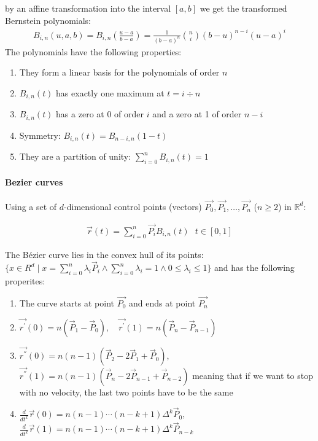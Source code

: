 by an affine transformation into the interval $[a,b]$ we get the transformed Bernstein polynomials:
\begin{align*}
	B_{i,n}(u,a,b) = B_{i,n}\left(\frac{u-a}{b-a}\right) 
	= \frac{1}{(b-a)^n}\binom{n}{i}(b-u)^{n-i}(u-a)^i
\end{align*}
The polynomials have the following properties:
\begin{enumerate}
	\item They form a linear basis for the polynomials of order $n$
	\item $B_{i,n}(t)$ has exactly one maximum at $t = i\div n$
	\item $B_{i,n}(t)$ has a zero at 0 of order $i$ and a zero at 1 of order $n-i$
	\item Symmetry: $B_{i,n}(t) = B_{n-i,n}(1 - t)$
	\item They are a partition of unity: $\sum_{i=0}^n B_{i,n}(t) = 1$
\end{enumerate}

\paragraph{Bezier curves}
Using a set of $d$-dimensional control points (vectors) $\vec{P_0}, \vec{P_1}, \ldots, \vec{P_n}$ ($n\geq 2$) in $\mathbb{R}^d$:
\begin{snugshade*}
	\begin{align*}
		\vec{r}(t) = \sum_{i=0}^n \vec{P_i}B_{i,n}(t)\ \ \ t\in[0,1]
	\end{align*}
\end{snugshade*}
The B\'ezier curve lies in the convex hull of its points:
$\{x\in R^{d}\mid x=\sum_{i=0}^{n}\lambda_{i}{\vec{P}}_{i}\wedge\sum_{i=0}^{n}\lambda_{i}=1\wedge 0\leq\lambda_{i}\leq1\}$
and has the following properites:
\begin{enumerate}
	\item The curve starts at point $\vec{P_0}$ and ends at point $\vec{P_n}$
	\item $\vec{r^{\prime}}(0) = n(\vec{P}_{1}-\vec{P}_{0}), \quad\vec{r^{\prime}}(1)=n(\vec{P}_{n}-\vec{P}_{n-1})$
	\item{
		$\vec{r^{''}}(0) = n(n-1)(\vec{P}_{2}-2\vec{P}_{1}+\vec{P}_{0})$,
		$\vec{r^{''}}(1)=n(n-1)(\vec{P}_{n}-2\vec{P}_{n-1}+\vec{P}_{n-2})$
		meaning that if we want to stop with no velocity, the last two points have to be the same
	}
	\item{
		$\frac{d}{d t^{k}}\vec{r}(0) = n(n-1)\cdots(n-k+1)\Delta^{k}\vec{P}_{0}$,
		$\frac{d}{d t^{k}}\vec{r}(1)=n(n-1)\cdots(n-k+1)\Delta^{k}\vec{P}_{n-k}$
	}
\end{enumerate}


